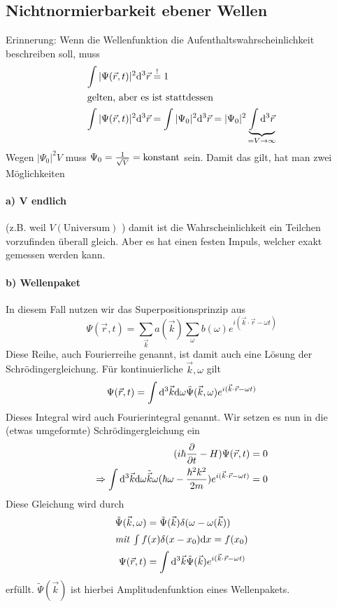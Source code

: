 \subsection{Nichtnormierbarkeit ebener Wellen}
Erinnerung: Wenn die Wellenfunktion die Aufenthaltswahrscheinlichkeit beschreiben soll, muss
\begin{align*}
\int |\Psi(\vec{r}, t)|^2 \mathrm d^3 \vec{r} &\overset!= 1\\
\intertext{gelten, aber es ist stattdessen}
\int |\Psi(\vec{r}, t)|^2 \mathrm d^3 \vec{r} &= \int |\Psi_0|^2 \mathrm d^3 \vec{r} = |\Psi_0|^2 \underbrace{\int \mathrm d^3 \vec{r}}_{=V \to \infty}
\end{align*}
Wegen $|\Psi_0|^2 V$ muss $\Psi_0 = \frac{1}{\sqrt V} = \text{konstant}$ sein. Damit das gilt, hat man zwei Möglichkeiten
\paragraph{a) V endlich} (z.B. weil $V(\text{Universum})$ ) damit ist die Wahrscheinlichkeit ein Teilchen vorzufinden überall gleich. Aber es hat einen festen Impuls, welcher exakt gemessen werden kann.
\paragraph{b) \textbf{Wellenpaket}}
In diesem Fall nutzen wir das Superpositionsprinzip aus
$$\Psi(\vec{r}, t) = \sum_{\vec{k}} a (\vec{k}) \sum_{\omega} b(\omega) e^{i(\vec{k}\cdot \vec{r} - \omega t)}$$
Diese Reihe, auch Fourierreihe genannt, ist damit auch eine Lösung der Schrödingergleichung. Für kontinuierliche $\vec{k}, \omega$ gilt
$$\Psi(\vec{r}, t) = \int \mathrm d^3 \vec{k} \mathrm d \omega \tilde\Psi (\vec{k}, \omega) e^{i(\vec{k}\cdot \vec{r} - \omega t)}$$ Dieses Integral wird auch Fourierintegral genannt. Wir setzen es nun in die (etwas umgeformte) Schrödingergleichung ein
\begin{align*}
	(i \hbar \frac{\partial}{\partial t} - H) \Psi(\vec{r}, t) &= 0\\
	\Rightarrow \int \mathrm d^3 \vec{k} \mathrm d \omega \tilde{\vec{k}}\omega (\hbar \omega - \frac{\hbar^2 k^2}{2m}) e^{i(\vec{k}\cdot \vec{r} - \omega t)} &= 0
\end{align*}
Diese Gleichung wird durch
\begin{align*}
\tilde\Psi(\vec{k}, \omega) &= \tilde\Psi (\vec{k}) \delta(\omega - \omega(\vec k))\\
\intertext{\textit{mit} $\int f(x) \delta(x - x_0) \mathrm d x = f (x_0)$}
\Psi(\vec{r}, t) &= \int \mathrm d^3 \vec{k} \tilde{\Psi} (\vec{k}) e^{i(\vec{k}\cdot \vec{r} - \omega t)}
\end{align*}
erfüllt.
$\tilde \Psi(\vec{k})$ ist hierbei Amplitudenfunktion eines Wellenpakets.

